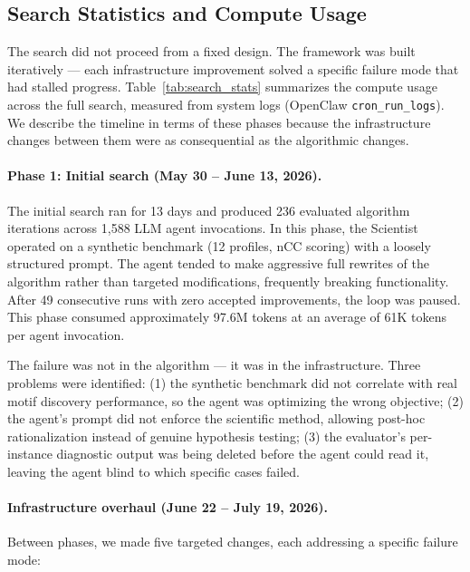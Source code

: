 \documentclass[11pt,a4paper]{article}
\begin{document}
\subsection{Search Statistics and Compute Usage}

The search did not proceed from a fixed design. The framework was built iteratively --- each infrastructure improvement solved a specific failure mode that had stalled progress. Table~\ref{tab:search_stats} summarizes the compute usage across the full search, measured from system logs (OpenClaw \texttt{cron\_run\_logs}). We describe the timeline in terms of these phases because the infrastructure changes between them were as consequential as the algorithmic changes.

\paragraph{Phase 1: Initial search (May 30 -- June 13, 2026).}
The initial search ran for 13 days and produced 236 evaluated algorithm iterations across 1,588 LLM agent invocations. In this phase, the Scientist operated on a synthetic benchmark (12 profiles, nCC scoring) with a loosely structured prompt. The agent tended to make aggressive full rewrites of the algorithm rather than targeted modifications, frequently breaking functionality. After 49 consecutive runs with zero accepted improvements, the loop was paused. This phase consumed approximately 97.6M tokens at an average of 61K tokens per agent invocation.

The failure was not in the algorithm --- it was in the infrastructure. Three problems were identified: (1) the synthetic benchmark did not correlate with real motif discovery performance, so the agent was optimizing the wrong objective; (2) the agent's prompt did not enforce the scientific method, allowing post-hoc rationalization instead of genuine hypothesis testing; (3) the evaluator's per-instance diagnostic output was being deleted before the agent could read it, leaving the agent blind to which specific cases failed.

\paragraph{Infrastructure overhaul (June 22 -- July 19, 2026).}
Between phases, we made five targeted changes, each addressing a specific failure mode:
\end{document}
